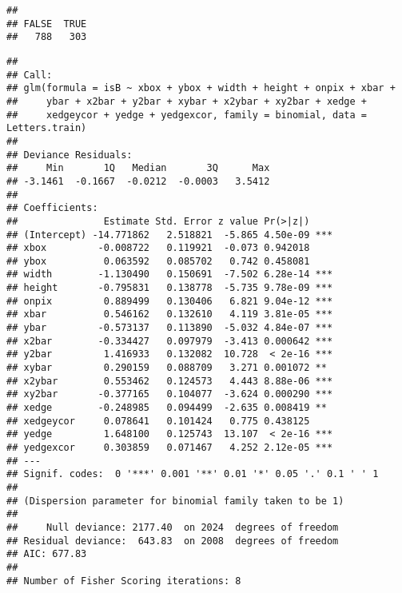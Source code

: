 \documentclass[]{article}
\newenvironment{Shaded}{\begin{snugshade}}{\end{snugshade}}
\newcommand{\CommentTok}[1]{\textcolor[rgb]{0.56,0.35,0.01}{\textit{#1}}}
\newcommand{\DataTypeTok}[1]{\textcolor[rgb]{0.13,0.29,0.53}{#1}}
\newcommand{\KeywordTok}[1]{\textcolor[rgb]{0.13,0.29,0.53}{\textbf{#1}}}
\newcommand{\NormalTok}[1]{#1}
\newcommand{\OperatorTok}[1]{\textcolor[rgb]{0.81,0.36,0.00}{\textbf{#1}}}
\newcommand{\StringTok}[1]{\textcolor[rgb]{0.31,0.60,0.02}{#1}}
\begin{document}
\begin{verbatim}
## 
## FALSE  TRUE 
##   788   303
\end{verbatim}

\begin{Shaded}
\end{Shaded}

\begin{verbatim}
## 
## Call:
## glm(formula = isB ~ xbox + ybox + width + height + onpix + xbar + 
##     ybar + x2bar + y2bar + xybar + x2ybar + xy2bar + xedge + 
##     xedgeycor + yedge + yedgexcor, family = binomial, data = Letters.train)
## 
## Deviance Residuals: 
##     Min       1Q   Median       3Q      Max  
## -3.1461  -0.1667  -0.0212  -0.0003   3.5412  
## 
## Coefficients:
##               Estimate Std. Error z value Pr(>|z|)    
## (Intercept) -14.771862   2.518821  -5.865 4.50e-09 ***
## xbox         -0.008722   0.119921  -0.073 0.942018    
## ybox          0.063592   0.085702   0.742 0.458081    
## width        -1.130490   0.150691  -7.502 6.28e-14 ***
## height       -0.795831   0.138778  -5.735 9.78e-09 ***
## onpix         0.889499   0.130406   6.821 9.04e-12 ***
## xbar          0.546162   0.132610   4.119 3.81e-05 ***
## ybar         -0.573137   0.113890  -5.032 4.84e-07 ***
## x2bar        -0.334427   0.097979  -3.413 0.000642 ***
## y2bar         1.416933   0.132082  10.728  < 2e-16 ***
## xybar         0.290159   0.088709   3.271 0.001072 ** 
## x2ybar        0.553462   0.124573   4.443 8.88e-06 ***
## xy2bar       -0.377165   0.104077  -3.624 0.000290 ***
## xedge        -0.248985   0.094499  -2.635 0.008419 ** 
## xedgeycor     0.078641   0.101424   0.775 0.438125    
## yedge         1.648100   0.125743  13.107  < 2e-16 ***
## yedgexcor     0.303859   0.071467   4.252 2.12e-05 ***
## ---
## Signif. codes:  0 '***' 0.001 '**' 0.01 '*' 0.05 '.' 0.1 ' ' 1
## 
## (Dispersion parameter for binomial family taken to be 1)
## 
##     Null deviance: 2177.40  on 2024  degrees of freedom
## Residual deviance:  643.83  on 2008  degrees of freedom
## AIC: 677.83
## 
## Number of Fisher Scoring iterations: 8
\end{verbatim}
\end{document}
